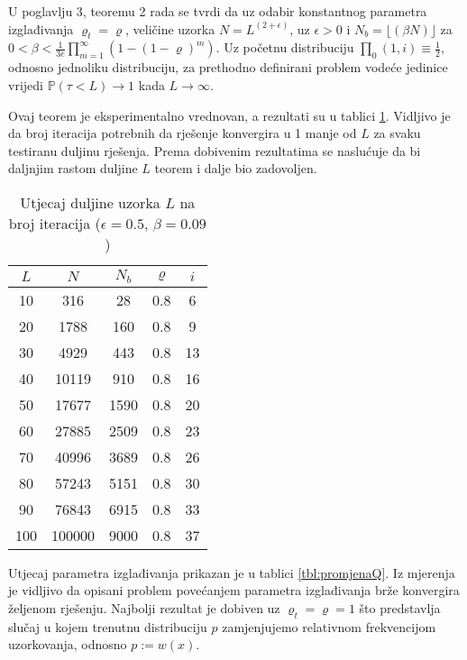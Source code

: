 \documentclass[times, utf8, zavrsni]{fer}
\newcommand{\floor}[1]{\lfloor #1 \rfloor}
\begin{document}
U poglavlju 3, teoremu 2 rada \cite{DBLP:journals/tec/WuK14} se tvrdi da uz odabir konstantnog parametra izglađivanja $\varrho_t = \varrho$, veličine uzorka $N = L^{(2 + \epsilon)}$, uz $\epsilon > 0$ i
$N_b =  \floor{(\beta N)}$ za $0 < \beta < \frac{1}{3e} \prod^{\infty}_{m=1} (1 - (1 - \varrho)^m)$. Uz početnu distribuciju
$\prod_0(1, i) \equiv \frac{1}{2}$, odnosno jednoliku distribuciju, za prethodno definirani
problem vodeće jedinice vrijedi $\mathbb{P}(\tau < L) \rightarrow 1$ kada $L \rightarrow \infty$.

Ovaj teorem je eksperimentalno vrednovan, a rezultati su u tablici \ref{tbl:promjenaL}. Vidljivo je da broj iteracija potrebnih da rješenje
konvergira u 1 manje od $L$ za svaku testiranu duljinu rješenja. Prema dobivenim rezultatima se naslućuje da bi daljnjim rastom duljine $L$
teorem i dalje bio zadovoljen.
\begin{table}[h!]
  \caption{Utjecaj duljine uzorka $L$ na broj iteracija ($\epsilon = 0.5$, $\beta = 0.09$)}
  \label{tbl:promjenaL}
  \centering
  \begin{tabular}{c | c | c | c | c}
    $L$ & $N$ & $N_b$ & $\varrho$ & $i$ \\ \hline
    10 & 316 & 28 & 0.8 & 6 \\ \hline
    20 & 1788 & 160 & 0.8 & 9 \\ \hline
    30 & 4929 & 443 & 0.8 & 13 \\ \hline
    40 & 10119 & 910 & 0.8 & 16 \\ \hline
    50 & 17677 & 1590 & 0.8 & 20 \\ \hline
    60 & 27885 & 2509 & 0.8 & 23 \\ \hline
    70 & 40996 & 3689 & 0.8 & 26 \\ \hline
    80 & 57243 & 5151 & 0.8 & 30 \\ \hline
    90 & 76843 & 6915 & 0.8 & 33 \\ \hline
    100 & 100000 & 9000 & 0.8 & 37
  \end{tabular}
\end{table}



Utjecaj parametra izglađivanja prikazan je u tablici \ref{tbl:promjenaQ}. Iz mjerenja je vidljivo da opisani problem povećanjem parametra izglađivanja
brže konvergira željenom rješenju. Najbolji rezultat je dobiven uz $\varrho_t = \varrho = 1$ što predstavlja slučaj u kojem trenutnu distribuciju
$p$ zamjenjujemo relativnom frekvencijom uzorkovanja, odnosno $p := w(x)$.
\end{document}
